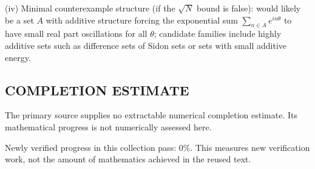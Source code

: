 (iv) Minimal counterexample structure (if the $\sqrt{N}$ bound is false): would likely be a set $A$ with additive structure forcing the exponential sum $\sum_{n\in A} e^{in\theta}$ to have small real part oscillations for all $\theta$; candidate families include highly additive sets such as difference sets of Sidon sets or sets with small additive energy.




\subsection*{COMPLETION ESTIMATE}
The primary source supplies no extractable numerical completion estimate. Its mathematical progress is not numerically assessed here.

Newly verified progress in this collection pass: $0\%$. This measures new verification work, not the amount of mathematics achieved in the reused text.
